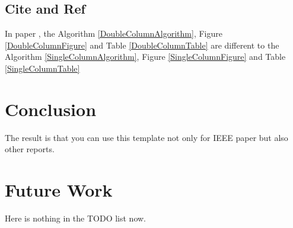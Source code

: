 \documentclass[conference]{IEEEtran}
\begin{document}
\subsection{Cite and Ref}
In paper \cite{eternallyascend2023latex4ieee}, the Algorithm \ref{DoubleColumnAlgorithm}, Figure \ref{DoubleColumnFigure} and Table \ref{DoubleColumnTable} are different to the Algorithm \ref{SingleColumnAlgorithm}, Figure \ref{SingleColumnFigure} and Table \ref{SingleColumnTable}

\section{Conclusion}
The result is that you can use this template not only for IEEE paper but also other reports.

\section{Future Work}
Here is nothing in the TODO list now.






\end{document}
